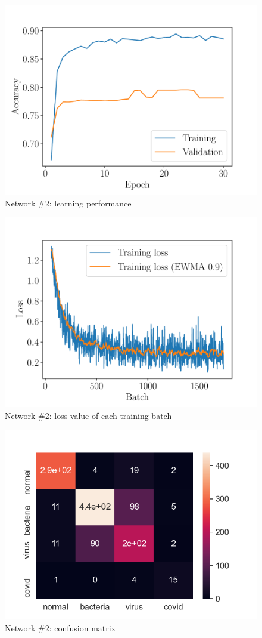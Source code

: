 \documentclass[10pt,a4paper,twocolumn]{article}
\begin{document}
\begin{figure}
    \centering \includegraphics[width=\linewidth]{plot_dnn_macc}
    \caption{Network \#2: learning performance}
\end{figure}

\begin{figure}
    \centering \includegraphics[width=\linewidth]{plot_dnn_loss}
    \caption{Network \#2: loss value of each training batch}
\end{figure}

\begin{figure}
    \centering \includegraphics[width=\linewidth]{dnn_confusion}
    \caption{Network \#2: confusion matrix}
\end{figure}


%
%
\end{document}
